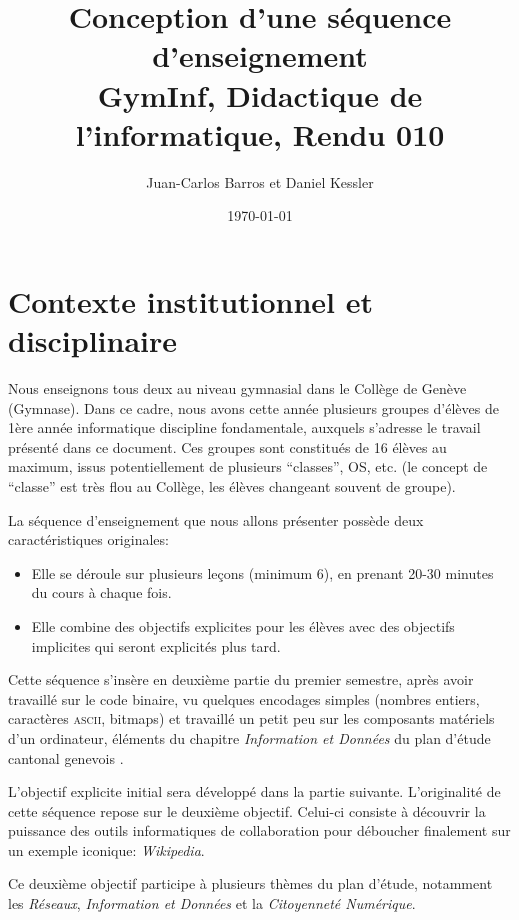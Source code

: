 \documentclass[11pt,bibliography=totoc]{scrartcl}
\author{Juan-Carlos Barros et Daniel Kessler}
\date{\today}
\title{Conception d'une séquence d'enseignement\\\medskip
  \large GymInf, Didactique de l'informatique, Rendu 010}
\begin{document}
\thispagestyle{plain}  %

\maketitle
\tableofcontents  %
\pagebreak

\section{Contexte institutionnel et disciplinaire}
Nous enseignons tous deux au niveau gymnasial dans le Collège de Genève
(Gymnase). Dans ce cadre, nous avons cette année plusieurs groupes d'élèves de
1ère année informatique discipline fondamentale, auxquels s'adresse le travail
présenté dans ce document. Ces groupes sont constitués de 16 élèves au maximum,
issus potentiellement de plusieurs ``classes'', OS, etc.  (le concept de
``classe'' est très flou au Collège, les élèves changeant souvent de groupe).

La séquence d'enseignement que nous allons présenter possède deux
caractéristiques originales:
\begin{itemize}
\item Elle se déroule sur plusieurs leçons (minimum  6), en prenant 20-30 minutes du cours à
  chaque fois.
\item Elle combine des objectifs explicites pour les élèves avec des objectifs
  implicites qui seront explicités plus tard.
\end{itemize}

Cette séquence s'insère en deuxième partie du premier semestre, après avoir
travaillé sur le code binaire, vu quelques encodages simples (nombres entiers,
caractères \textsc{ascii}, bitmaps) et travaillé un petit peu sur les composants
matériels d'un ordinateur, éléments du chapitre \textit{Information et Données}
du plan d'étude cantonal genevois \autocite{pecinfo}.

L'objectif explicite initial sera développé dans la partie
suivante. L'originalité de cette séquence repose sur le deuxième
objectif. Celui-ci consiste à découvrir la puissance des outils informatiques de
collaboration pour déboucher finalement sur un exemple iconique:
\textit{Wikipedia}.

Ce deuxième objectif participe à plusieurs thèmes du plan d'étude, notamment les
\textit{Réseaux}, \textit{Information et Données} et la \textit{Citoyenneté
  Numérique}.
\end{document}
